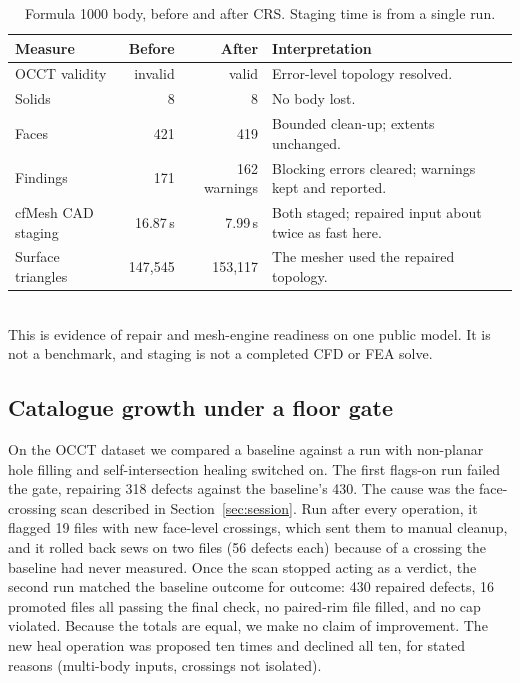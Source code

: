 \documentclass[11pt,onecolumn]{article}
\begin{document}
\begin{table}[t]
\centering
\caption{Formula 1000 body, before and after CRS. Staging time is from a single run.}
\label{tab:f1000}
\small
\begin{tabularx}{\textwidth}{@{}l r r X@{}}
\toprule
\textbf{Measure} & \textbf{Before} & \textbf{After} & \textbf{Interpretation}\\
\midrule
OCCT validity     & invalid  & valid         & Error-level topology resolved.\\
Solids            & 8        & 8             & No body lost.\\
Faces             & 421      & 419           & Bounded clean-up; extents unchanged.\\
Findings          & 171      & 162 warnings  & Blocking errors cleared; warnings kept and reported.\\
cfMesh CAD staging& 16.87\,s & 7.99\,s       & Both staged; repaired input about twice as fast here.\\
Surface triangles & 147,545  & 153,117       & The mesher used the repaired topology.\\
\bottomrule
\end{tabularx}
\\[2pt]
\footnotesize This is evidence of repair and mesh-engine readiness on one public model. It is not a
benchmark, and staging is not a completed CFD or FEA solve.
\end{table}

\subsection{Catalogue growth under a floor gate}\label{sec:floorgate}
On the OCCT dataset we compared a baseline against a run with non-planar hole filling and
self-intersection healing switched on. The first flags-on run failed the gate, repairing 318 defects
against the baseline's 430. The cause was the face-crossing scan described in
Section~\ref{sec:session}. Run after every operation, it flagged 19 files with new face-level
crossings, which sent them to manual cleanup, and it rolled back sews on two files (56 defects each)
because of a crossing the baseline had never measured. Once the scan stopped acting as a verdict,
the second run matched the baseline outcome for outcome: 430 repaired defects, 16 promoted files all
passing the final check, no paired-rim file filled, and no cap violated. Because the totals are
equal, we make no claim of improvement. The new heal operation was proposed ten times and declined
all ten, for stated reasons (multi-body inputs, crossings not isolated).
\end{document}
